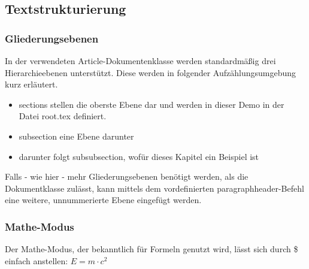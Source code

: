 \subsection{Textstrukturierung}
  \subsubsection{Gliederungsebenen}
    In der verwendeten Article-Dokumentenklasse werden standardmäßig drei Hierarchieebenen unterstützt.
    Diese werden in folgender Aufzählungsumgebung kurz erläutert.
    
    \begin{itemize}
      \item sections stellen die oberste Ebene dar und werden in dieser Demo in der Datei root.tex definiert.
      \item subsection eine Ebene darunter
      \item darunter folgt subsubsection, wofür dieses Kapitel ein Beispiel ist 
    \end{itemize}

    Falls - wie hier - mehr Gliederungsebenen benötigt werden, als die Dokumentklasse zulässt, 
    kann mittels dem vordefinierten paragraphheader-Befehl eine weitere, unnummerierte Ebene eingefügt werden.
   
  \subsubsection{Mathe-Modus}
    Der Mathe-Modus, der bekanntlich für Formeln genutzt wird, lässt sich durch \$ einfach anstellen:
    $E = m \cdot c^2$